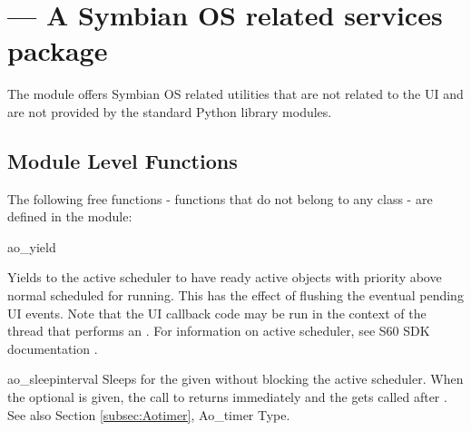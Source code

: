 %
%
%

\section{ ---
  A Symbian OS related services package} 
\label{sec:e32}


The  module offers Symbian OS related utilities that are not 
related to the UI and are not provided by the standard Python library 
modules.

\subsection{Module Level Functions}
\label{subsec:e32}

The following free functions - functions that do not belong to any class 
- are defined in the  module:

\begin{funcdesc}{ao_yield}{}

Yields to the active scheduler to have ready active objects with priority above 
normal scheduled for running. This has the effect of flushing the eventual 
pending UI events. Note that the UI callback code may be run in the context of 
the thread that performs an . For information on active 
scheduler, see S60 SDK documentation \cite{S60Doc}.

\end{funcdesc}

\begin{funcdesc}{ao_sleep}{interval }
Sleeps for the given  without blocking the active 
scheduler. When the optional  is given, the call 
to  returns immediately and the 
 gets called after . See 
also Section \ref{subsec:Aotimer}, Ao_timer Type.
\end{funcdesc}

